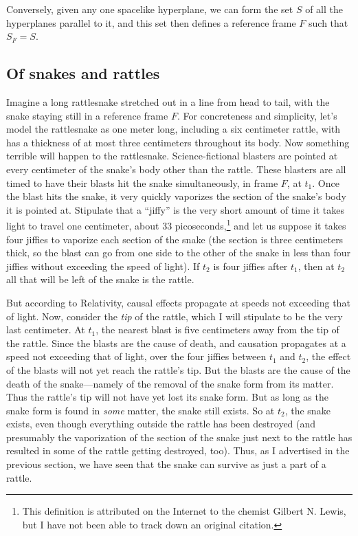 Conversely, given any one spacelike hyperplane, we can form the set $S$ of all the hyperplanes parallel to it, and this 
set then defines a reference frame $F$ such that $S_F=S$.

\subsection{Of snakes and rattles}
Imagine a long rattlesnake stretched out in a line from head to tail, with the snake staying still in a reference frame $F$. For concreteness and 
simplicity, let's model the rattlesnake as one meter long, including a six centimeter rattle, with has a thickness of at 
most three centimeters throughout its body. Now something terrible will happen to the rattlesnake. Science-fictional blasters 
are pointed at every centimeter of the  snake's body other than the rattle. These blasters are all timed to have their blasts 
hit the snake simultaneously, in frame $F$, at $t_1$. Once the blast hits the snake, it very quickly vaporizes the section 
of the snake's body it is pointed at. Stipulate that a ``jiffy'' is the very short amount of time it takes light to travel one 
centimeter, about 33 picoseconds,\footnote{This definition is attributed on the Internet to the chemist Gilbert N. Lewis, but 
I have not been able to track 
down an original citation.} and let us suppose it takes four jiffies to vaporize each section of the snake (the section 
is three centimeters thick, so the blast can go from one side to the other of the snake in less than four jiffies without exceeding the 
speed of light). If $t_2$ is four jiffies after $t_1$, then at $t_2$ all that will be left of the snake is the rattle. 

But according to Relativity, causal effects propagate at speeds not exceeding that of light. Now, consider the \textit{tip}
of the rattle, which I will stipulate to be the very last centimeter. At $t_1$, the nearest blast is five centimeters away from 
the tip of the rattle. Since the blasts are the cause of death, and causation propagates at a speed not exceeding that of light,
over the four jiffies between $t_1$ and $t_2$, the effect of the blasts will not yet reach the rattle's tip. But the blasts are 
the cause of the death of the snake---namely of the removal of the snake form from its matter. Thus the rattle's tip will not 
have yet lost its snake form. But as long as the snake form is found in \textit{some} matter, the snake still exists. So 
at $t_2$, the snake exists, even though everything outside the rattle has been destroyed (and presumably the vaporization of 
the section of the snake just next to the rattle has resulted in some of the rattle getting destroyed, too). Thus, as I advertised 
in the previous section, we have seen that the snake can survive as just a part of a rattle.

